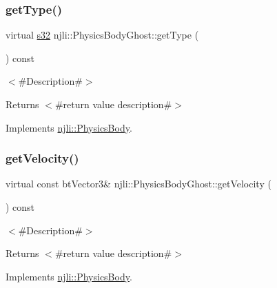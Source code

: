 \subsubsection{\texorpdfstring{get\+Type()}{getType()}}
{\footnotesize\ttfamily virtual \mbox{\hyperlink{_util_8h_aa62c75d314a0d1f37f79c4b73b2292e2}{s32}} njli\+::\+Physics\+Body\+Ghost\+::get\+Type (\begin{DoxyParamCaption}{ }\end{DoxyParamCaption}) const\hspace{0.3cm}{\ttfamily [virtual]}}

$<$\#\+Description\#$>$

\begin{DoxyReturn}{Returns}
$<$\#return value description\#$>$ 
\end{DoxyReturn}


Implements \mbox{\hyperlink{classnjli_1_1_physics_body_a1338648bed55e4ca2d3c50d953fd60c4}{njli\+::\+Physics\+Body}}.

\mbox{\label{classnjli_1_1_physics_body_ghost_aee53dbc6a3aba8ab33c10e3523f1f4dc}} 
\subsubsection{\texorpdfstring{get\+Velocity()}{getVelocity()}}
{\footnotesize\ttfamily virtual const bt\+Vector3\& njli\+::\+Physics\+Body\+Ghost\+::get\+Velocity (\begin{DoxyParamCaption}{ }\end{DoxyParamCaption}) const\hspace{0.3cm}{\ttfamily [virtual]}}

$<$\#\+Description\#$>$

\begin{DoxyReturn}{Returns}
$<$\#return value description\#$>$ 
\end{DoxyReturn}


Implements \mbox{\hyperlink{classnjli_1_1_physics_body_add437a6d229dfbf74a838d0de7229867}{njli\+::\+Physics\+Body}}.

\mbox{\label{classnjli_1_1_physics_body_ghost_a6b131b8407733cc046c4c8fa38b35055}} 
